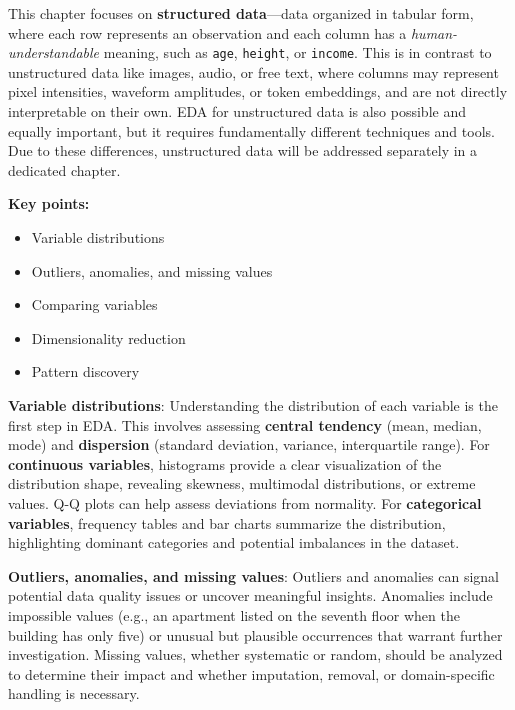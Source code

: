 \documentclass[12pt,openany]{book}
\begin{document}
This chapter focuses on \textbf{structured data}—data organized in tabular 
form, where each row represents an observation and each column has a 
\textit{human-understandable} meaning, such as \texttt{age}, \texttt{height}, 
or \texttt{income}. This is in contrast to unstructured data like images, 
audio, or free text, where columns may represent pixel intensities, 
waveform amplitudes, or token embeddings, and are not directly interpretable 
on their own. EDA for unstructured data is also possible and equally important, but it requires fundamentally different techniques and tools. Due to these differences, unstructured data will be addressed separately in a dedicated chapter. \newline

\textbf{Key points:}
\begin{itemize}
    \item Variable distributions
    \item Outliers, anomalies, and missing values
    \item Comparing variables
    \item Dimensionality reduction
    \item Pattern discovery
\end{itemize}

\textbf{Variable distributions}: Understanding the distribution of each variable is the first step in EDA. This involves assessing \textbf{central tendency} (mean, median, mode) and \textbf{dispersion} (standard deviation, variance, interquartile range). For \textbf{continuous variables}, histograms provide a clear visualization of the distribution shape, revealing skewness, multimodal distributions, or extreme values. Q-Q plots can help assess deviations from normality. For \textbf{categorical variables}, frequency tables and bar charts summarize the distribution, highlighting dominant categories and potential imbalances in the dataset.
\newline

\textbf{Outliers, anomalies, and missing values}: Outliers and anomalies can signal potential data quality issues or uncover meaningful insights. Anomalies include impossible values (e.g., an apartment listed on the seventh floor when the building has only five) or unusual but plausible occurrences that warrant further investigation. Missing values, whether systematic or random, should be analyzed to determine their impact and whether imputation, removal, or domain-specific handling is necessary.
\newline
\end{document}
